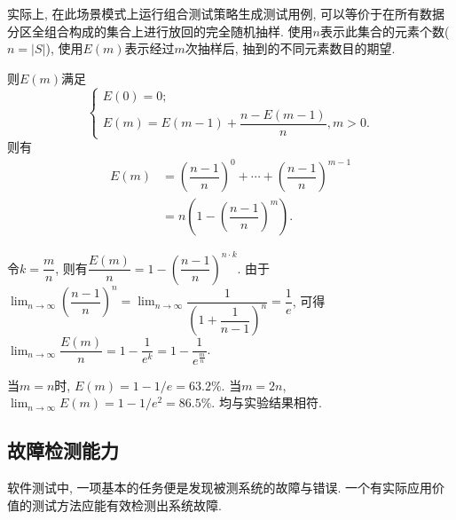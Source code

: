                 \vspace{1em}

                实际上, 在此场景模式上运行组合测试策略生成测试用例, 可以等价于在所有数据分区全组合构成的集合上进行放回的完全随机抽样. 使用$n$表示此集合的元素个数($n = |S|$), 使用$E(m)$表示经过$m$次抽样后, 抽到的不同元素数目的期望.
    
                则$E(m)$满足
                \begin{equation*}
                    \left\{
                    \begin{array}{l}
                         E(0) = 0; \\
                         E(m) = E(m-1) + \dfrac{n - E(m-1)}{n}, m > 0.
                    \end{array}
                    \right.
                \end{equation*}
                则有
                \begin{equation*}
                    \begin{aligned}
                        E(m) & =\left(\dfrac{n-1}{n}\right)^{0} + \cdots + \left(\dfrac{n-1}{n}\right)^{m-1} \\
                        & = n\left(1-(\dfrac{n-1}{n})^{m}\right).
                    \end{aligned}
                \end{equation*}
                
                令$k = \dfrac{m}{n}$, 则有$\dfrac{E(m)}{n} = 1 - \left(\dfrac{n-1}{n}\right)^{n\cdot k}$. 由于$\lim_{n\to\infty} \left(\dfrac{n-1}{n}\right)^n = \lim_{n\to\infty} \dfrac{1}{\left(1+\dfrac{1}{n-1}\right)^n} = \dfrac{1}{e}$, 可得$\lim_{n\to\infty}\dfrac{E(m)}{n} = 1 - \dfrac{1}{e^{k}} = 1 - \dfrac{1}{e^\frac{m}{n}}$.
                
                当$m=n$时, $E(m) = 1 - 1 / e = 63.2\%$. 当$m=2n$, $\lim_{n\to\infty} E(m) = 1 - 1 / e^2 = 86.5\%$. 均与实验结果相符.
    
        \subsection{故障检测能力}
        
            软件测试中, 一项基本的任务便是发现被测系统的故障与错误. 一个有实际应用价值的测试方法应能有效检测出系统故障.
            
